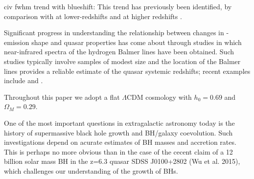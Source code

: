 civ fwhm trend with blueshift: This trend has previously been identified, by comparison with  at lower-redshifts \citep{shen08,shen11} and \hb at higher redshifts \citep{shen12}.


Significant progress in understanding the relationship between changes in -emission shape and quasar properties has come about through studies in which near-infrared spectra of the hydrogen Balmer lines have been obtained. 
Such studies typically involve samples of modest size and the location of the Balmer lines provides a reliable estimate of the quasar systemic redshifts; recent examples include \citet{shen12} and \citet{marziani16}. 

Throughout this paper we adopt a flat $\Lambda$CDM cosmology with $h_0=0.69$ and $\Omega_M=0.29$. 

One of the most important questions in extragalactic astronomy today is the history of supermassive black hole growth and BH/galaxy coevolution. 
Such investigations depend on acurate estimates of BH masses and accretion rates. 
This is perhaps no more obvious than in the case of the cecent claim of a 12 billion solar mass BH in the z=6.3 quasar SDSS J0100+2802 (Wu et al. 2015), which challenges our understanding of the growth of BHs. 
